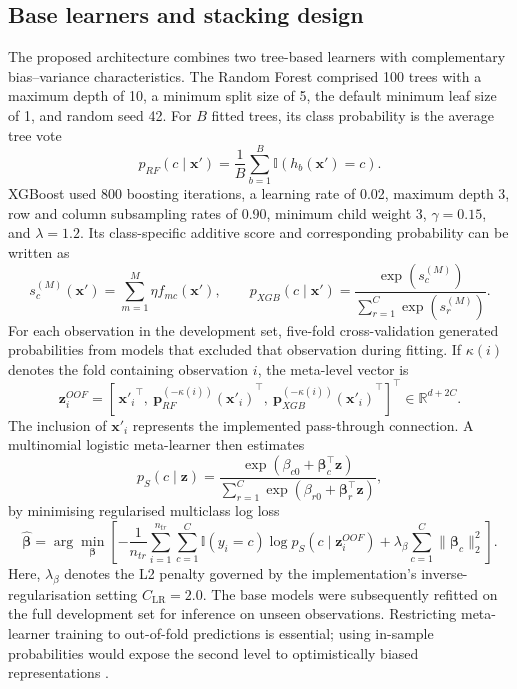 ﻿\documentclass[preprint,12pt]{elsarticle}
\begin{document}
\subsection{Base learners and stacking design}
The proposed architecture combines two tree-based learners with complementary bias--variance characteristics. The Random Forest comprised 100 trees with a maximum depth of 10, a minimum split size of 5, the default minimum leaf size of 1, and random seed 42. For $B$ fitted trees, its class probability is the average tree vote
\begin{equation}
p_{RF}(c\mid\mathbf{x}')=\frac{1}{B}\sum_{b=1}^{B}
\mathbb{I}\!\left(h_b(\mathbf{x}')=c\right).
\label{eq:rf}
\end{equation}
XGBoost used 800 boosting iterations, a learning rate of 0.02, maximum depth 3, row and column subsampling rates of 0.90, minimum child weight 3, $\gamma=0.15$, and $\lambda=1.2$. Its class-specific additive score and corresponding probability can be written as
\begin{equation}
s_c^{(M)}(\mathbf{x}')=\sum_{m=1}^{M}\eta f_{mc}(\mathbf{x}'),
\qquad
p_{XGB}(c\mid\mathbf{x}')=
\frac{\exp(s_c^{(M)})}{\sum_{r=1}^{C}\exp(s_r^{(M)})}.
\label{eq:xgb}
\end{equation}
For each observation in the development set, five-fold cross-validation generated probabilities from models that excluded that observation during fitting. If $\kappa(i)$ denotes the fold containing observation $i$, the meta-level vector is
\begin{equation}
\mathbf{z}^{OOF}_i=\left[\,{\mathbf{x}'_i}^{\!\top},\
{\mathbf{p}_{RF}^{(-\kappa(i))}(\mathbf{x}'_i)}^{\!\top},\
{\mathbf{p}_{XGB}^{(-\kappa(i))}(\mathbf{x}'_i)}^{\!\top}\right]^{\!\top}
\in\mathbb{R}^{d+2C}.
\label{eq:oofvector}
\end{equation}
The inclusion of $\mathbf{x}'_i$ represents the implemented pass-through connection. A multinomial logistic meta-learner then estimates
\begin{equation}
p_{S}(c\mid\mathbf{z})=
\frac{\exp(\beta_{c0}+\boldsymbol{\beta}_c^{\top}\mathbf{z})}
{\sum_{r=1}^{C}\exp(\beta_{r0}+\boldsymbol{\beta}_r^{\top}\mathbf{z})},
\label{eq:meta}
\end{equation}
by minimising regularised multiclass log loss
\begin{equation}
\widehat{\boldsymbol{\beta}}=
\arg\min_{\boldsymbol{\beta}}
\left[-\frac{1}{n_{tr}}\sum_{i=1}^{n_{tr}}\sum_{c=1}^{C}
\mathbb{I}(y_i=c)\log p_S(c\mid\mathbf{z}^{OOF}_i)
+\lambda_{\beta}\sum_{c=1}^{C}\lVert\boldsymbol{\beta}_c\rVert_2^2\right].
\label{eq:metaloss}
\end{equation}
Here, $\lambda_{\beta}$ denotes the L2 penalty governed by the implementation's inverse-regularisation setting $C_{\mathrm{LR}}=2.0$. The base models were subsequently refitted on the full development set for inference on unseen observations. Restricting meta-learner training to out-of-fold predictions is essential; using in-sample probabilities would expose the second level to optimistically biased representations \cite{kapoor2023,alabi2023}.
\end{document}
